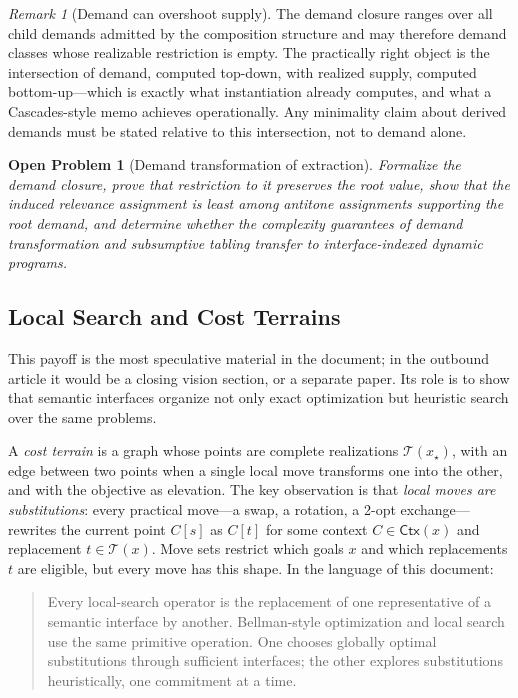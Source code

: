 \documentclass[sigconf,nonacm]{acmart}
\theoremstyle{definition}
\theoremstyle{plain}
\newtheorem{openproblem}[definition]{Open Problem}
\theoremstyle{remark}
\newtheorem{remark}[definition]{Remark}
\begin{document}
\begin{remark}[Demand can overshoot supply]
The demand closure ranges over all child demands admitted by the
composition structure and may therefore demand classes whose
realizable restriction is empty.  The practically right object is
the intersection of demand, computed top-down, with realized supply,
computed bottom-up---which is exactly what instantiation already
computes, and what a Cascades-style memo achieves operationally.
Any minimality claim about derived demands must be stated relative
to this intersection, not to demand alone.
\end{remark}

\begin{openproblem}[Demand transformation of extraction]
\label{open:demand}
Formalize the demand closure, prove that restriction to it preserves
the root value, show that the induced relevance assignment is least
among antitone assignments supporting the root demand, and determine
whether the complexity guarantees of demand transformation and
subsumptive tabling transfer to interface-indexed dynamic programs.
\end{openproblem}

\subsection{Local Search and Cost Terrains}
\label{sec:terrain}

This payoff is the most speculative material in the document; in
the outbound article it would be a closing vision section, or a
separate paper.  Its role is to show that semantic interfaces
organize not only exact optimization but heuristic search over the
same problems.

A \emph{cost terrain} is a graph whose points are complete
realizations $\mathcal T(x_\star)$, with an edge between two points
when a single local move transforms one into the other, and with the
objective as elevation.  The key observation is that \emph{local
moves are substitutions}: every practical move---a swap, a rotation,
a 2-opt exchange---rewrites the current point $C[s]$ as $C[t]$ for
some context $C\in\mathsf{Ctx}(x)$ and replacement
$t\in\mathcal T(x)$.  Move sets restrict which goals $x$ and which
replacements $t$ are eligible, but every move has this shape.  In
the language of this document:

\begin{quote}
Every local-search operator is the replacement of one representative
of a semantic interface by another.  Bellman-style optimization and
local search use the same primitive operation.  One chooses globally
optimal substitutions through sufficient interfaces; the other
explores substitutions heuristically, one commitment at a time.
\end{quote}
\end{document}
